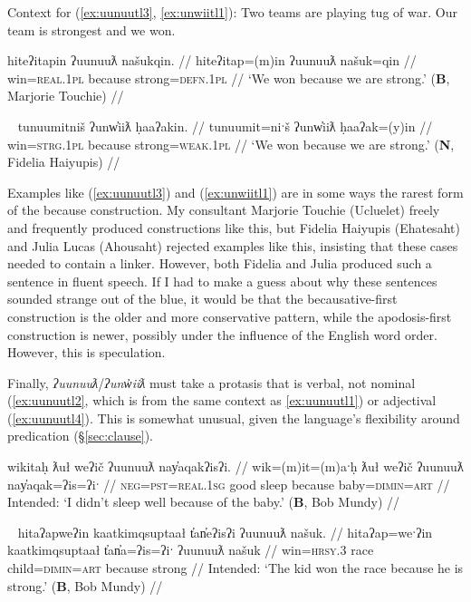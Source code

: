\vspace{5pt}

\noindent Context for (\ref{ex:uunuutl3}, \ref{ex:unwiitl1}): Two teams are playing tug of war. Our team is strongest and we won.

\ex \label{ex:uunuutl3}
\begingl
\glpreamble hiteʔitapin ʔuunuuƛ našukqin. //
\gla hiteʔitap=(m)in ʔuunuuƛ našuk=qin //
\glb win=\textsc{real.1pl} because strong=\textsc{defn.1pl} //
\glft `We won because we are strong.' (\textbf{B}, Marjorie Touchie) //
\endgl
\xe

\ex~ \label{ex:unwiitl1}
\begingl
\glpreamble tunuumitniš ʔunw̓iiƛ ḥaaʔakin. //
\gla tunuumit=niˑš ʔunw̓iiƛ ḥaaʔak=(y)in //
\glb win=\textsc{strg.1pl} because strong=\textsc{weak.1pl} //
\glft `We won because we are strong.' (\textbf{N}, Fidelia Haiyupis) //
\endgl
\xe

Examples like (\ref{ex:uunuutl3}) and (\ref{ex:unwiitl1}) are in some ways the rarest form of the because construction. My consultant Marjorie Touchie (Ucluelet) freely and frequently produced constructions like this, but Fidelia Haiyupis (Ehatesaht) and Julia Lucas (Ahousaht) rejected examples like this, insisting that these cases needed to contain a linker. However, both Fidelia and Julia produced such a sentence in fluent speech. If I had to make a guess about why these sentences sounded strange out of the blue, it would be that the becausative-first construction is the older and more conservative pattern, while the apodosis-first construction is newer, possibly under the influence of the English word order. However, this is speculation.

Finally, \textit{ʔuunuuƛ}/\textit{ʔunw̓iiƛ} must take a protasis that is verbal, not nominal (\ref{ex:uunuutl2}, which is from the same context as \ref{ex:uunuutl1}) or adjectival (\ref{ex:uunuutl4}). This is somewhat unusual, given the language's flexibility around predication (\S\ref{sec:clause}).

\ex \label{ex:uunuutl2}
\begingl
\glpreamble *wikitaḥ ƛuł weʔič ʔuunuuƛ nay̓aqakʔisʔi. //
\gla wik=(m)it=(m)aˑḥ ƛuł weʔič ʔuunuuƛ nay̓aqak=ʔis=ʔiˑ //
\glb \textsc{neg}=\textsc{pst}=\textsc{real.1sg} good sleep because baby=\textsc{dimin}=\textsc{art} //
\glft Intended: `I didn't sleep well because of the baby.' (\textbf{B}, Bob Mundy) //
\endgl
\xe


\ex~ \label{ex:uunuutl4}
\begingl
\glpreamble *hitaʔapweʔin kaatkimqsuptaał t̓an̓eʔisʔi ʔuunuuƛ našuk. //
\gla hitaʔap=weˑʔin kaatkimqsuptaał t̓an̓a=ʔis=ʔiˑ ʔuunuuƛ našuk //
\glb win=\textsc{hrsy.3} race child=\textsc{dimin}=\textsc{art} because strong //
\glft Intended: `The kid won the race because he is strong.' (\textbf{B}, Bob Mundy) //
\endgl
\xe

